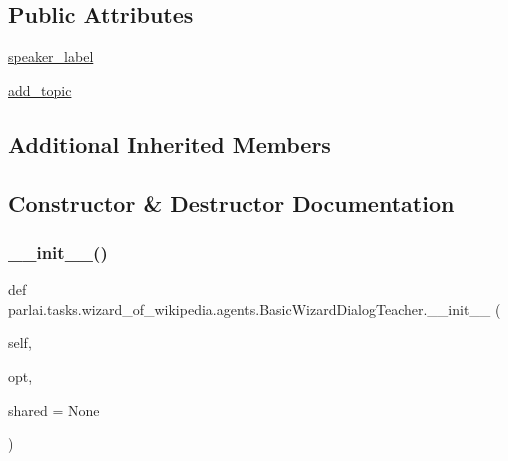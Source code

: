 \subsection*{Public Attributes}
\begin{DoxyCompactItemize}
\item 
\hyperlink{classparlai_1_1tasks_1_1wizard__of__wikipedia_1_1agents_1_1BasicWizardDialogTeacher_a7cba3c53db23ee567eeafa10b1f48840}{speaker\+\_\+label}
\item 
\hyperlink{classparlai_1_1tasks_1_1wizard__of__wikipedia_1_1agents_1_1BasicWizardDialogTeacher_a5d822b8cbc645ad8c451c6ff3fca9af3}{add\+\_\+topic}
\end{DoxyCompactItemize}
\subsection*{Additional Inherited Members}


\subsection{Constructor \& Destructor Documentation}
\mbox{\label{classparlai_1_1tasks_1_1wizard__of__wikipedia_1_1agents_1_1BasicWizardDialogTeacher_acdbd15d6e87bcc9e1c0482284a8119ec}} 
\subsubsection{\texorpdfstring{\+\_\+\+\_\+init\+\_\+\+\_\+()}{\_\_init\_\_()}}
{\footnotesize\ttfamily def parlai.\+tasks.\+wizard\+\_\+of\+\_\+wikipedia.\+agents.\+Basic\+Wizard\+Dialog\+Teacher.\+\_\+\+\_\+init\+\_\+\+\_\+ (\begin{DoxyParamCaption}\item[{}]{self,  }\item[{}]{opt,  }\item[{}]{shared = {\ttfamily None} }\end{DoxyParamCaption})}



